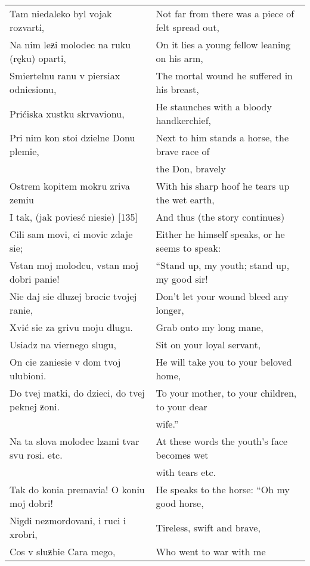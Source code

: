 \begin{footnotesize}
\begin{longtable}{ l l }
    Tam niedaleko byl vojak rozvarti, & Not far from there was a piece of felt spread out, \\
    Na nim leƶi molodec na ruku (ręku) oparti, & On it lies a young fellow leaning on his arm, \\
    Smiertelnu ranu v piersiax odniesionu, & The mortal wound he suffered in his breast, \\
    Prićiska xustku skrvavionu, & He staunches with a bloody handkerchief, \\
    Pri nim kon stoi dzielne Donu plemie, & Next to him stands a horse, the brave race of \\
    & \hspace*{3.85cm}the Don, bravely \\
    Ostrem kopitem mokru zriva zemiu & With his sharp hoof he tears up the wet earth, \\
    I tak, (jak poviesć niesie) [135] & And thus (the story continues) \\
    Cili sam movi, ci movic zdaje sie; & Either he himself speaks, or he seems to speak: \\
    Vstan moj molodcu, vstan moj dobri panie! & “Stand up, my youth; stand up, my good sir! \\
    Nie daj sie dluzej brocic tvojej ranie, & Don’t let your wound bleed any longer, \\
    Xvić sie za grivu moju dlugu. & Grab onto my long mane, \\
    Usiadz na viernego slugu, & Sit on your loyal servant, \\
    On cie zaniesie v dom tvoj ulubioni. & He will take you to your beloved home, \\
    Do tvej matki, do dzieci, do tvej peknej ƶoni. & To your mother, to your children, to your dear \\
    & \hspace*{4.7cm}wife.” \\
    Na ta slova molodec lzami tvar svu rosi. etc. & At these words the youth’s face becomes wet \\ 
    & \hspace*{3.128cm}with tears etc. \\
    Tak do konia premavia! O koniu moj dobri! & He speaks to the horse: “Oh my good horse, \\
    Nigdi nezmordovani, i ruci i xrobri, & Tireless, swift and brave, \\
    Cos v sluƶbie Cara mego, & Who went to war with me \\

\end{longtable}
\end{footnotesize}
